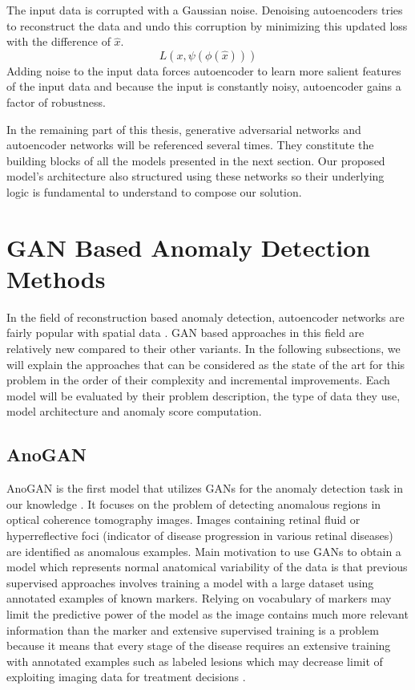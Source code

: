 The input data is corrupted with a Gaussian noise. Denoising autoencoders tries to
reconstruct the data and undo this corruption by minimizing this updated loss with the difference of
$\hat{x}$.
$$
L(x, \psi(\phi(\hat{x})))
$$
Adding noise to the input data forces autoencoder to learn more salient features of the input data and because 
the input is constantly noisy, autoencoder gains a factor of robustness.

In the remaining part of this thesis, generative adversarial networks and autoencoder networks will be referenced 
several times. They constitute the building blocks of all the models presented in the next section. Our proposed 
model's architecture also structured using these networks so their underlying logic is fundamental to understand 
to compose our solution.

\section{GAN Based Anomaly Detection Methods}
\label{sec:gan_based_sota}
In the field of reconstruction based anomaly detection, autoencoder networks 
are fairly popular with spatial data \cite{baldi2012autoencoders,leveau2017adversarial,an2015variational}.
GAN based approaches in this field are relatively new compared to their other variants.
In the following subsections, we will explain the approaches that can be considered as the state of
the art for this problem in the order of their complexity and incremental improvements. Each
model will be evaluated by their problem description, the type of data they use, model
architecture and anomaly score computation. 

\subsection{AnoGAN}
\label{sec:anogan}
 AnoGAN is the first model that utilizes GANs for the anomaly detection task in our knowledge
\cite{Schlegl2017UnsupervisedAD}. It focuses on the problem of detecting anomalous regions in optical
coherence tomography images. Images containing retinal fluid or hyperreflective foci (indicator of
disease progression in various retinal diseases) are identified as anomalous examples. Main
motivation to use GANs to obtain a model which represents normal anatomical variability of the data
is that previous supervised approaches involves training a model with a large dataset using
annotated examples of known markers. Relying on vocabulary of markers may limit the predictive power
of the model as the image contains much more relevant information than the marker and extensive
supervised training is a problem because it means that every stage of the disease requires an
extensive training with annotated examples such as labeled lesions which may decrease limit of
exploiting imaging data for treatment decisions \cite{Schlegl2017UnsupervisedAD}.


